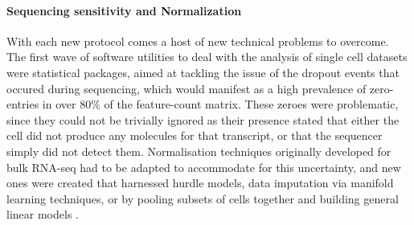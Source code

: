 \paragraph{Sequencing sensitivity and Normalization}
With each new protocol comes a host of new technical problems to overcome. The first wave of software utilities to deal with the analysis of single cell datasets were statistical packages, aimed at tackling the issue of the dropout events that occured during sequencing, which would manifest as a high prevalence of zero-entries in over 80\% of the feature-count matrix. These zeroes were problematic, since they could not be trivially ignored as their presence stated that either the cell did not produce any molecules for that transcript, or that the sequencer simply did not detect them. Normalisation techniques originally developed for bulk RNA-seq had to be adapted to accommodate for this uncertainty, and new ones were created that harnessed hurdle models, data imputation via manifold learning techniques, or by pooling subsets of cells together and building general linear models \citep{camara2018methods}.

